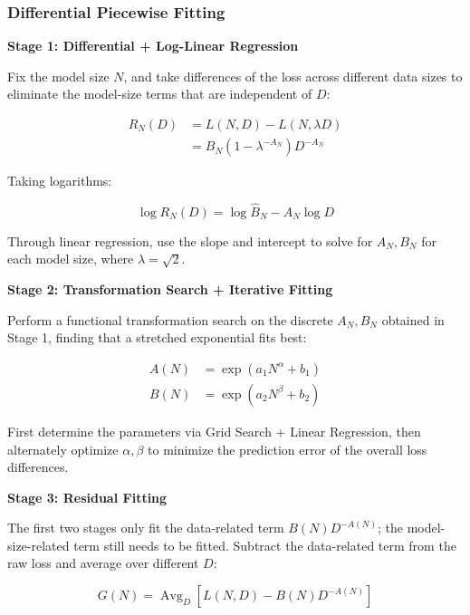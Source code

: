 \documentclass[
  english,
  11pt,
  a4paper,
]{article}
\newenvironment{NotesFormula}{%
  \par\noindent\begin{minipage}{\linewidth}%
  \setlength{\parindent}{2em}%
  \setlength{\parskip}{0.35em}%
}{\end{minipage}\par}
\begin{document}
\subsubsection{Differential Piecewise
Fitting}\label{differential-piecewise-fitting}

\textbf{Stage 1: Differential + Log-Linear Regression}

\begin{NotesFormula}

Fix the model size \(N\), and take differences of the loss across
different data sizes to eliminate the model-size terms that are
independent of \(D\):

\[\begin{aligned}
R_N(D)&=L(N,D)-L(N,\lambda D)\\
&=B_N(1-\lambda^{-A_N})D^{-A_N}
\end{aligned}\]

\end{NotesFormula}

\begin{NotesFormula}

Taking logarithms:

\[\log R_N(D)=\log\hat B_N-A_N\log D\]

\end{NotesFormula}

Through linear regression, use the slope and intercept to solve for
\(A_N,B_N\) for each model size, where \(\lambda=\sqrt2\).

\textbf{Stage 2: Transformation Search + Iterative Fitting}

\begin{NotesFormula}

Perform a functional transformation search on the discrete \(A_N,B_N\)
obtained in Stage 1, finding that a stretched exponential fits best:

\[\boxed{
\begin{aligned}
A(N)&=\exp(a_1N^\alpha+b_1)\\
B(N)&=\exp(a_2N^\beta+b_2)
\end{aligned}}\]

\end{NotesFormula}

First determine the parameters via Grid Search + Linear Regression, then
alternately optimize \(\alpha,\beta\) to minimize the prediction error
of the overall loss differences.

\textbf{Stage 3: Residual Fitting}

\begin{NotesFormula}

The first two stages only fit the data-related term \(B(N)D^{-A(N)}\);
the model-size-related term still needs to be fitted. Subtract the
data-related term from the raw loss and average over different \(D\):

\[G(N)=\operatorname{Avg}_D\left[L(N,D)-B(N)D^{-A(N)}\right]\]

\end{NotesFormula}
\end{document}
